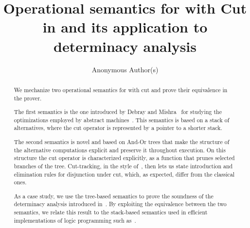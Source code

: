 \documentclass[sigplan,10pt,anonymous,review]{acmart}
\begin{document}
%
\author{Anonymous Author(s)}

\title{Operational semantics for \prologP with Cut in \rocqP
and its application to determinacy analysis} %

\begin{abstract}
We mechanize two operational semantics for \prologP with cut and prove their
equivalence in the \rocqP{} prover.

The first semantics is the one introduced by Debray and
Mishra~\cite{Debray1988} for studying the optimizations employed by
\prologP abstract machines~\cite{warren1983abstract,10.1007/BFb0105415}.
This semantics is based on a stack of alternatives, where the cut operator is
represented by a pointer to a shorter stack. 

The second semantics is novel and based on And-Or trees %
that make the structure
of the alternative computations explicit and preserve it throughout execution.
On this structure the cut operator is characterized explicitly, as a function
that prunes selected branches of the tree. Cut-tracking, in the style
of~\cite{1996mogensen,miniKanren}, then lets us state introduction and
elimination rules for disjunction under cut, which, as expected, differ from the
classical ones.

As a case study, we use the tree-based semantics to prove the soundness of
the determinacy analysis introduced in~\cite{fissore2026}. By exploiting the
equivalence between the two semantics, we relate this result to the
stack-based semantics used in efficient implementations of logic programming
such as~\cite{dunchev15lpar}.
\end{abstract}


\maketitle              %
\end{document}
